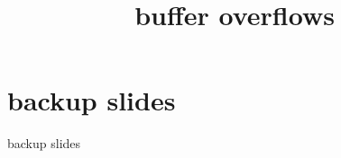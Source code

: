 \graphicspath{{./figures/}}
\title{buffer overflows}
\date{}

\begin{frame}
    \titlepage
\end{frame}


\usetikzlibrary{arrows.meta}



\section{backup slides}
\begin{frame}{backup slides}
\end{frame}



